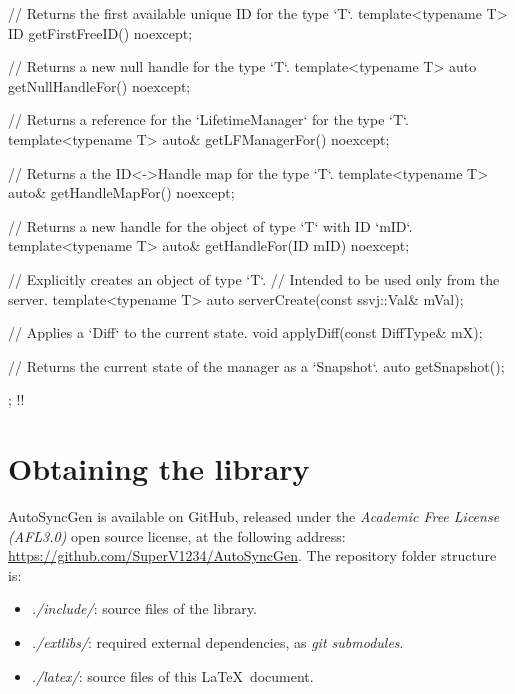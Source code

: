 \documentclass{report}
\begin{document}
{{            // Returns the first available unique ID for the type `T`.
            template<typename T> ID getFirstFreeID() noexcept;

            // Returns a new null handle for the type `T`.
            template<typename T> auto getNullHandleFor() noexcept;
            
            // Returns a reference for the `LifetimeManager` for the type `T`.
            template<typename T> auto& getLFManagerFor() noexcept;

            // Returns a the ID<->Handle map for the type `T`.
            template<typename T> auto& getHandleMapFor() noexcept;

            // Returns a new handle for the object of type `T` with ID `mID`.
            template<typename T> auto& getHandleFor(ID mID) noexcept;

            // Explicitly creates an object of type `T`. 
            // Intended to be used only from the server.
            template<typename T> auto serverCreate(const ssvj::Val& mVal);

            // Applies a `Diff` to the current state.
            void applyDiff(const DiffType& mX);

            // Returns the current state of the manager as a `Snapshot`.
            auto getSnapshot();
    };
!!}

    \newpage

    \chapter{Obtaining the library}

        AutoSyncGen is available on GitHub, released under the \emph{Academic Free License (AFL3.0)} open source license, at the following address: \url{https://github.com/SuperV1234/AutoSyncGen}.
        The repository folder structure is:

        \begin{itemize}
            \item \emph{./include/}: source files of the library.
            \item \emph{./extlibs/}: required external dependencies, as \emph{git submodules}.
            \item \emph{./latex/}: source files of this \LaTeX\ document.
        \end{itemize}
\end{document}

